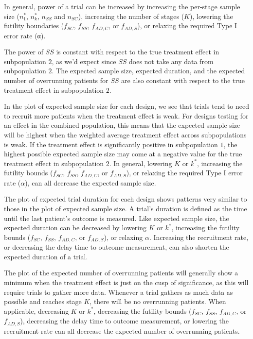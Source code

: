 \documentclass{article}
\begin{document}
In general, power of a trial can be increased by increasing the per-stage sample size ($n_1^*$, $n_k^*$, $n_{SS}$ and $n_{SC}$), increasing the number of stages ($K$), lowering the futility boundaries ($f_{SC}$, $f_{SS}$, $f_{AD,C}$, or $f_{AD,S}$), or relaxing the required Type I error rate (α).

The power of $SS$ is constant with respect to the true treatment effect in subpopulation $2$, as we'd expect since $SS$ does not take any data from subpopulation $2$. The expected sample size, expected duration, and the expected number of overrunning patients for $SS$ are also constant with respect to the true treatment effect in subpopulation $2$.

In the plot of expected sample size for each design, we see that trials tend to need to recruit more patients when the treatment effect is weak. For designs testing for an effect in the combined population, this means that the expected sample size will be highest when the weighted average treatment effect across subpopulations is weak. If the treatment effect is significantly positive in subpopulation $1$, the highest possible expected sample size may come at a negative value for the true treatment effect in subpopulation $2$. In general, lowering $K$ or $k^*$, increasing the futility bounds ($f_{SC}$, $f_{SS}$, $f_{AD,C}$, or $f_{AD,S}$), or relaxing the required Type I error rate ($α$), can all decrease the expected sample size.

The plot of expected trial duration for each design shows patterns very similar to those in the plot of expected sample size. A trial's duration is defined as the time until the last patient's outcome is measured. Like expected sample size, the expected duration can be decreased by lowering $K$ or $k^*$, increasing the futility bounds ($f_{SC}$, $f_{SS}$, $f_{AD,C}$, or $f_{AD,S}$), or relaxing $α$. Increasing the recruitment rate, or decreasing the delay time to outcome measurement, can also shorten the expected duration of a trial.

The plot of the expected number of overrunning patients will generally show a minimum when the treatment effect is just on the cusp of significance, as this will require trials to gather more data. Whenever a trial gathers as much data as possible and reaches stage $K$,  there will be no overrunning patients. When applicable, decreasing $K$ or $k^*$, decreasing the futility bounds ($f_{SC}$, $f_{SS}$, $f_{AD,C}$, or $f_{AD,S}$), decreasing the delay time to outcome measurement, or lowering the recruitment rate can all decrease the expected number of overrunning patients.
\end{document}

